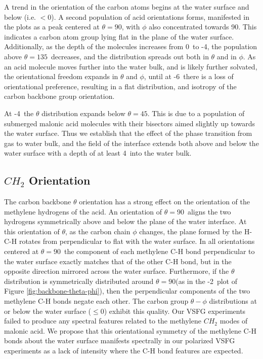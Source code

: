 A trend in the orientation of the carbon atoms begins at the water surface and below (i.e. $<0$\angs). A second population of acid orientations forms, manifested in the plots as a peak centered at $\theta=90$\textdegree, with $\phi$ also concentrated towards 90\textdegree. This indicates a carbon atom group lying flat in the plane of the water surface. Additionally, as the depth of the molecules increases from 0\angs~to -4\angs, the population above $\theta=135$\textdegree~decreases, and the distribution spreads out both in $\theta$ and in $\phi$. As an acid molecule moves further into the water bulk, and is likely further solvated, the orientational freedom expands in $\theta$ and $\phi$, until at -6\angs~there is a loss of orientational preference, resulting in a flat distribution, and isotropy of the carbon backbone group orientation.

At -4\angs~the $\theta$ distribution expands below $\theta=45$\textdegree. This is due to a population of submerged malonic acid molecules with their bisectors aimed slightly up towards the water surface. Thus we establish that the effect of the phase transition from gas to water bulk, and the field of the interface extends both above and below the water surface with a depth of at least 4\angs~into the water bulk.


\subsection {$CH_2$ Orientation}

The carbon backbone $\theta$ orientation has a strong effect on the orientation of the methylene hydrogens of the acid. An orientation of $\theta=90$\textdegree~aligns the two hydrogens symmetrically above and below the plane of the water interface. At this orientation of $\theta$, as the carbon chain $\phi$ changes, the plane formed by the H-C-H rotates from perpendicular to flat with the water surface. In all orientations centered at $\theta=90$\textdegree~the component of each methylene C-H bond perpendicular to the water surface exactly matches that of the other C-H bond, but in the opposite direction mirrored across the water surface. Furthermore, if the $\theta$ distribution is symmetrically distributed around $\theta=90$\textdegree (as in the -2\angs~plot of Figure \ref{fig:backbone-theta-phi}), then the perpendicular components of the two methylene C-H bonds negate each other. The carbon group $\theta-\phi$ distributions at or below the water surface ($\le 0$\angs) exhibit this quality. Our VSFG experiments failed to produce any spectral features related to the methylene $CH_2$ modes of malonic acid. We propose that this orientational symmetry of the methylene C-H bonds about the water surface manifests spectrally in our polarized VSFG experiments as a lack of intensity where the C-H bond features are expected. 

